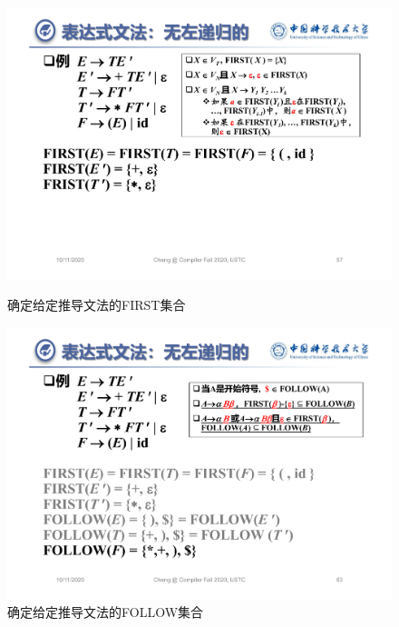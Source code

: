 \documentclass[]{report}
\begin{document}
		\begin{figure}[h!]
			\centering
			\begin{minipage}{20em}
				\centering
				\includegraphics[scale = 0.2]{images/LL1_first.pdf}
				\caption{确定给定推导文法的FIRST集合}
			\end{minipage}
			\begin{minipage}{20em}
				\centering
				\includegraphics[scale = 0.2]{images/LL1_follow.pdf}
				\caption{确定给定推导文法的FOLLOW集合}
			\end{minipage}
		\end{figure}
\end{document}
